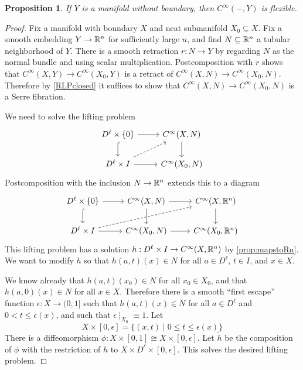 \documentclass{article}
\newtheorem{proposition}[theorem]{Proposition}
\newtheorem{proposed work}[theorem]{Proposed Work}
\begin{document}
\begin{proposition} \label{prop:mapstonoboundary}
  If $Y$ is a manifold without boundary, then $C^\infty(-, Y)$ is
  flexible. 
\end{proposition}

\begin{proof}
  Fix a manifold with boundary $X$ and neat submanifold
  $X_0\subseteq X$. Fix a smooth embedding $Y\to \mathbb R^n$ for
  sufficiently large $n$, and find $N\subseteq \mathbb R^n$ a tubular
  neighborhood of $Y$. There is a smooth retraction $r: N \to Y$
  by regarding $N$ as the normal bundle and using scalar
  multiplication. Postcomposition with $r$ shows that
  $C^\infty(X,Y)\to C^\infty(X_0, Y)$ is a retract of
  $C^\infty(X, N) \to C^\infty(X_0, N)$. Therefore by \ref{RLPclosed}
  it suffices to show that $C^\infty(X, N) \to C^\infty(X_0, N)$ is a
  Serre fibration.

  We need to solve the lifting problem
  \begin{equation*}
    \begin{tikzcd}
      D^\ell \times \{0\} \arrow[r] \arrow[hookrightarrow]{d}
      & C^\infty(X,N) \arrow[d] 
      \\
      D^\ell \times I \arrow[r] \arrow[dashed,ur] 
      & C^\infty(X_0, N) 
    \end{tikzcd}
  \end{equation*}
  Postcomposition with the inclusion $N\to \mathbb R^n$ extends this to a
  diagram
  \begin{equation*}
    \begin{tikzcd}
      D^\ell \times \{0\} \arrow[r] \arrow[hookrightarrow]{d}
      & C^\infty(X,N) \arrow[d] \arrow[r]
      & C^\infty(X, \R^n) \arrow[d] 
      \\
      D^\ell \times I \arrow[r] \arrow[dashed, urr]
      & C^\infty(X_0, N) \arrow[r]
      & C^\infty(X_0, \R^n)
    \end{tikzcd}
  \end{equation*}
  This lifting problem has a solution
  $h: D^\ell\times I \to C^\infty(X,\mathbb R^n)$ by \ref{prop:mapstoRn}. We
  want to modify $h$ so that $h(a,t)(x)\in N$ for all $a\in D^\ell$,
  $t\in I$, and $x\in X$.

  We know already that $h(a,t)(x_0) \in N$ for all $x_0\in X_0$, and
  that $h(a,0)(x)\in N$ for all $x\in X$. Therefore there is a
  smooth %
  ``first escape'' function $\epsilon :X\to (0,1]$ such
  that $h(a,t)(x)\in N$ for all $a\in D^\ell$ and
  $0 < t \leq \epsilon(x)$, and such that
  $\epsilon \mid_{X_0} \equiv 1$. Let 
  \[
    X\times [0,\epsilon] = \{ (x,t) \mid 0\leq t \leq \epsilon(x) \}
  \]
  There is a diffeomorphism
  $\phi: X\times [0,1] \cong X\times [0,\epsilon]$. Let $\tilde h$ be
  the composition of $\phi$ with the restriction of $h$ to $X\times
  D^\ell \times [0,\epsilon]$. This solves the desired lifting problem.
\end{proof}
\end{document}
